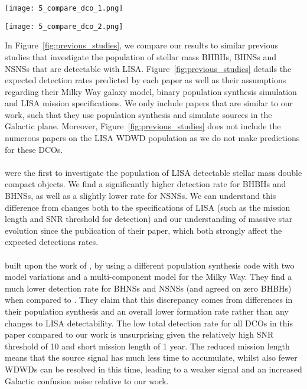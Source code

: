 \begin{figure*}[p]
    \centering
    \texttt{[image: 5\_compare\_dco\_1.png]}

    \vspace{0.5cm}

    \texttt{[image: 5\_compare\_dco\_2.png]}
    \caption{A table comparing previous studies of a similar nature to this work. The works listed in the table are \citet{Nelemans+2001}, \citet{Belczynski+2010}, \citet{Liu+2014}, \citet{Lamberts+2018}, \citet{Sesana+2020}, \citet{Lau+2020}, \citet{Breivik+2020} and \citet{Shao+2021}.}
    \label{fig:previous_studies}
\end{figure*}

In Figure~\ref{fig:previous_studies}, we compare our results to similar previous studies that investigate the population of stellar mass BHBHs, BHNSs and NSNSs that are detectable with LISA. Figure~\ref{fig:previous_studies} details the expected detection rates predicted by each paper as well as their assumptions regarding their Milky Way galaxy model, binary population synthesis simulation and LISA mission specifications. We only include papers that are similar to our work, such that they use population synthesis and simulate sources in the Galactic plane. Moreover, Figure~\ref{fig:previous_studies} does not include the numerous papers on the LISA WDWD population as we do not make predictions for these DCOs.
 
\paragraph{\citet{Nelemans+2001}} were the first to investigate the population of LISA detectable stellar mass double compact objects. We find a significantly higher detection rate for BHBHs and BHNSs, as well as a slightly lower rate for NSNSs. We can understand this difference from changes both to the specifications of LISA (such as the mission length and SNR threshold for detection) and our understanding of massive star evolution since the publication of their paper, which both strongly affect the expected detections rates.

\paragraph{\citet{Belczynski+2010}} built upon the work of \citet{Nelemans+2001}, by using a different population synthesis code with two model variations and a multi-component model for the Milky Way. They find a much lower detection rate for BHNSs and NSNSs (and agreed on zero BHBHs) when compared to \citet{Nelemans+2001}. They claim that this discrepancy comes from differences in their population synthesis and an overall lower formation rate rather than any changes to LISA detectability. The low total detection rate for all DCOs in this paper compared to our work is unsurprising given the relatively high SNR threshold of 10 and short mission length of 1 year. The reduced mission length means that the source signal has much less time to accumulate, whilst also fewer WDWDs can be resolved in this time, leading to a weaker signal and an increased Galactic confusion noise relative to our work.

